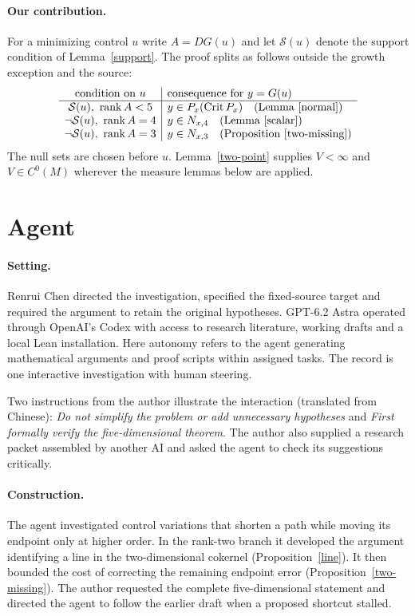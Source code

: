 \documentclass[11pt,letterpaper]{article}
\newcommand{\rank}{\operatorname{rank}}
\begin{document}
\paragraph{Our contribution.} For a minimizing control $u$ write $A=DG(u)$ and let $\mathcal S(u)$ denote
the support condition of Lemma~\ref{support}. The proof splits as follows
outside the growth exception and the source:
\[
\begin{array}{c|l}
 \text{condition on }u & \text{consequence for }y=G(u)\\ \hline
 \mathcal S(u),\ \rank A<5 & y\in P_x(\operatorname{Crit}P_x)
                                  \quad(\text{Lemma~\ref{normal}})\\
 \neg\mathcal S(u),\ \rank A=4 & y\in N_{x,4}\quad(\text{Lemma~\ref{scalar}})\\
 \neg\mathcal S(u),\ \rank A=3 & y\in N_{x,3}\quad(\text{Proposition~\ref{two-missing}})
\end{array}
\]
The null sets are chosen before $u$. Lemma~\ref{two-point} supplies
$V<\infty$ and $V\in C^0(M)$ wherever the measure lemmas below are applied.
\section{Agent}
\paragraph{Setting.} Renrui Chen directed the investigation, specified the
fixed-source target and required the argument to retain the original
hypotheses. GPT-6.2 Astra operated through OpenAI's Codex with access to
research literature, working drafts and a local Lean installation.
Here autonomy refers to the agent generating mathematical arguments
and proof scripts within assigned tasks. The record is one interactive
investigation with human steering.

Two instructions from the author illustrate the interaction (translated from
Chinese): \textit{Do not simplify the problem or add unnecessary hypotheses}
and \textit{First formally verify the five-dimensional theorem}. The author
also supplied a research packet assembled by another AI and asked the agent
to check its suggestions critically.

\paragraph{Construction.} The agent investigated control variations that
shorten a path while moving its endpoint only at higher order. In the
rank-two branch it developed the argument identifying a line in the
two-dimensional cokernel (Proposition~\ref{line}). It then bounded the
cost of correcting the remaining endpoint error (Proposition~\ref{two-missing}).
The author requested the complete five-dimensional statement and directed the
agent to follow the earlier draft when a proposed shortcut stalled.
\end{document}
